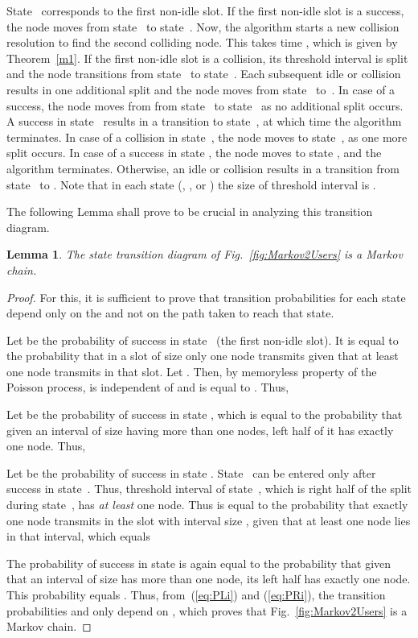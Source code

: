 \documentclass[12pt,draftcls,peerreview, onecolumn]{IEEEtran}
\newtheorem{lemma}{{\bf Lemma}}
\newcommand{\eqn}[1]{(\ref{#1})}
\begin{document}
State~ corresponds to the first non-idle slot. If the first
non-idle slot is a success, the node moves from state~ to
state~. Now, the algorithm starts a new collision
resolution to find the second colliding node. This takes time
, which is given by Theorem~\ref{m1}. If
the first non-idle slot is a collision, its threshold interval is
split and the node transitions from state~ to state~. Each
subsequent idle or collision results in one additional split and the
node moves from state~ to~.  In case of a success, the node
moves from from state~ to state~ as no additional split occurs.
A success in state~ results in a transition to state~,
at which time the algorithm terminates.  In case of a collision in
state~, the node moves to state~, as one more split
occurs.  In case of a success in state , the node moves to state
, and the algorithm terminates. Otherwise, an idle or
collision results in a transition from state~ to .  Note
that in each state (, , or ) the size of threshold
interval is .

The following Lemma shall prove to be crucial in analyzing this
transition diagram.
\begin{lemma}
The state transition diagram of Fig.~\ref{fig:Markov2Users} is a Markov chain.
\label{lem:markov2users}
\end{lemma}
\begin{proof}
For this, it is sufficient to prove that transition probabilities for each state depend only on the  and not on
the path taken to reach that state.

Let  be the probability of success in state~ (the first
non-idle slot). It is equal to the probability that in a slot of size
 only one node transmits given that at least one node transmits
in that slot. Let . Then, by memoryless property of
the Poisson process,  is independent of  and is equal to
. Thus,
 
Let  be the probability of success in state , which is equal to the probability
that given an interval of size 
having more than one nodes, left half of it has exactly one node.  Thus,
 
Let  be the probability of success in state . State~
 can be entered only after success in state~. Thus, threshold
 interval of state~, which is right half of the split during
 state~, has {\it at least} one node. Thus  is equal to
 the probability that exactly one node transmits in the slot with
 interval size , given that at least one node lies in that
 interval, which equals
 

 The probability of success in state  is again equal to the
 probability that given that an interval of size  has more
 than one node, its left half has exactly one node. This probability
 equals . Thus, from~\eqn{eq:PLi} and \eqn{eq:PRi}, the
 transition probabilities  and  only depend on ,
 which proves that Fig.~\ref{fig:Markov2Users} is a Markov chain.
\end{proof}
\end{document}

